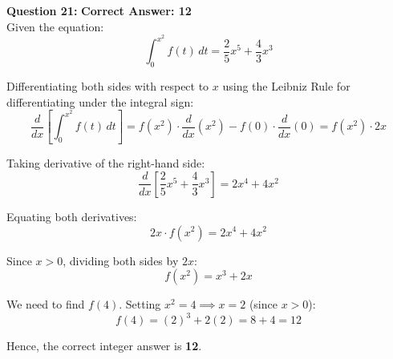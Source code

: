 \documentclass[11pt,a4paper]{article}
\begin{document}
\begin{tcolorbox}[solbox]
\textbf{\textcolor{primaryDark}{Question 21:}} \hfill \textbf{\textcolor{l1Green}{Correct Answer: 12}}\\
\vspace{4pt}
Given the equation:
$$\int_{0}^{x^2} f(t)\, dt = \frac{2}{5}x^5 + \frac{4}{3}x^3$$

Differentiating both sides with respect to $x$ using the Leibniz Rule for differentiating under the integral sign:
$$\frac{d}{dx}\left[ \int_{0}^{x^2} f(t)\, dt \right] = f(x^2) \cdot \frac{d}{dx}(x^2) - f(0) \cdot \frac{d}{dx}(0) = f(x^2) \cdot 2x$$

Taking derivative of the right-hand side:
$$\frac{d}{dx}\left[ \frac{2}{5}x^5 + \frac{4}{3}x^3 \right] = 2x^4 + 4x^2$$

Equating both derivatives:
$$2x \cdot f(x^2) = 2x^4 + 4x^2$$

Since $x > 0$, dividing both sides by $2x$:
$$f(x^2) = x^3 + 2x$$

We need to find $f(4)$. Setting $x^2 = 4 \implies x = 2$ (since $x > 0$):
$$f(4) = (2)^3 + 2(2) = 8 + 4 = 12$$

Hence, the correct integer answer is \textbf{12}.
\end{tcolorbox}
\end{document}

